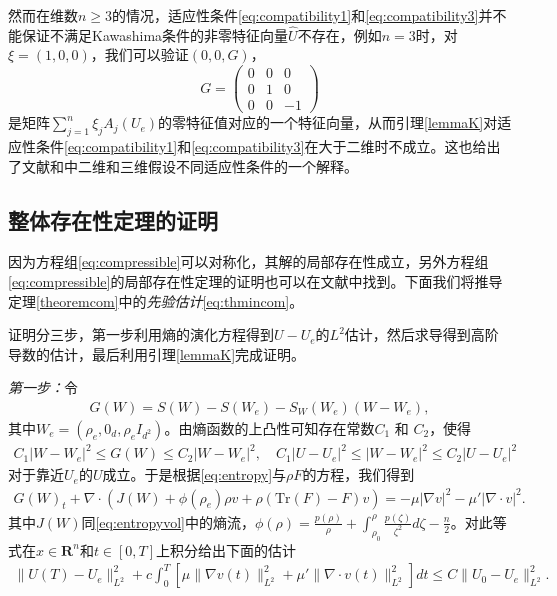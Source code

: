 \begin{remark}
然而在维数$n \ge 3$的情况，适应性条件\eqref{eq:compatibility1}和\eqref{eq:compatibility3}并不能保证不满足Kawashima条件的非零特征向量$\hat{U}$不存在，例如$n=3$时，对$\xi = (1,0,0)$，我们可以验证$(0,0, G)$，
 $$
 G = \left( \begin{array}{ccc}
 0 & 0 & 0 \\
 0 & 1 & 0 \\
 0 & 0 & -1 \end{array} \right)
 $$
是矩阵$ \sum_{j=1}^n \xi_j A_j(U_e)$的零特征值对应的一个特征向量，从而引理\ref{lemmaK}对适应性条件\eqref{eq:compatibility1}和\eqref{eq:compatibility3}在大于二维时不成立。这也给出了文献\cite{lin2005hydrodynamics}和\cite{liu2008global}中二维和三维假设不同适应性条件的一个解释。
\end{remark}

\subsection{整体存在性定理的证明}
因为方程组\eqref{eq:compressible}可以对称化，其解的局部存在性成立\cite{kawashima1984systems}，另外方程组\eqref{eq:compressible}的局部存在性定理的证明也可以在文献\cite{lin2005hydrodynamics,lei2008global,hu2013global}中找到。下面我们将推导定理\ref{theoremcom}中的\emph{先验估计}\eqref{eq:thmincom}。

证明分三步，第一步利用熵的演化方程得到$U-U_e$的$L^2$估计，然后求导得到高阶导数的估计，最后利用引理\ref{lemmaK}完成证明。

\emph{第一步：}令
\begin{eqnarray*}
  G(W) = S(W) - S(W_e) - S_W(W_e) (W-W_e),
\end{eqnarray*}
其中$W_e = (\rho_e, 0_d, \rho_e I_{d^2})$。由熵函数的上凸性可知存在常数$C_1$ 和 $C_2$，使得
\begin{eqnarray*}
  C_1 |W-W_e|^2 \le G(W) \le C_2 |W-W_e|^2, \quad C_1 |U-U_e|^2 \le |W-W_e|^2 \le C_2 |U-U_e|^2
\end{eqnarray*}
对于靠近$U_e$的$U$成立。于是根据\eqref{eq:entropy}与$\rho F$的方程，我们得到
\begin{eqnarray*}
  G(W)_t + \nabla \cdot (J(W) + \phi(\rho_e) \rho  v  + \rho (\mbox{Tr}(F) - F) v ) = -\mu |\nabla  v |^2 - \mu' |\nabla \cdot  v |^2.
\end{eqnarray*}
其中$J(W)$同\eqref{eq:entropyvol}中的熵流，$\phi(\rho) = \frac{p(\rho)}{\rho} + \int_{\rho_0}^{\rho}\frac{p(\zeta)}{\zeta^2}d\zeta - \frac{n}{2}$。对此等式在$x\in\mathbf{R}^n$和$t\in[0, T]$上积分给出下面的估计
\begin{eqnarray}\label{eq:EnergyESTcom}
  \|U(T) - U_e\|_{L^2}^2 + c \int_0^T[ \mu \|\nabla v (t)\|_{L^2}^2 +  \mu' \|\nabla \cdot  v (t)\|_{L^2}^2] dt
  \le C\|U_0-U_e\|_{L^2}^2 .
\end{eqnarray}

